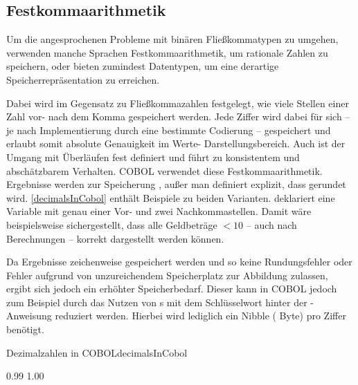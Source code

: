 \subsection*{Festkommaarithmetik}
Um die angesprochenen Probleme mit binären Fließkommatypen zu umgehen, verwenden manche Sprachen Festkommaarithmetik, um rationale Zahlen zu speichern, oder bieten zumindest Datentypen, um eine derartige Speicherrepräsentation zu erreichen. 

Dabei wird im Gegensatz zu Fließkommazahlen festgelegt, wie viele Stellen einer Zahl vor- \bzw nach dem Komma gespeichert werden. Jede Ziffer wird dabei für sich -- je nach Implementierung durch eine bestimmte Codierung -- gespeichert und erlaubt somit absolute Genauigkeit im Werte- \bzw Darstellungsbereich. Auch ist der Umgang mit Überläufen fest definiert und führt zu konsistentem und abschätzbarem Verhalten. COBOL verwendet diese Festkommaarithmetik. Ergebnisse werden zur Speicherung , außer man definiert explizit, dass gerundet wird. \autoref{decimalsInCobol} enthält Beispiele zu beiden Varianten.  deklariert eine Variable mit genau einer Vor- und zwei Nachkommastellen. Damit wäre beispielsweise sichergestellt, dass alle Geldbeträge $<10$ -- auch nach Berechnungen -- korrekt dargestellt werden können.

Da Ergebnisse zeichenweise gespeichert werden und so keine Rundungsfehler oder Fehler aufgrund von unzureichendem Speicherplatz zur Abbildung zulassen, ergibt sich jedoch ein erhöhter Speicherbedarf. Dieser kann in COBOL jedoch zum Beispiel durch das Nutzen von s mit dem Schlüsselwort  hinter der -Anweisung reduziert werden. Hierbei wird lediglich ein Nibble ( Byte) pro Ziffer benötigt.

\begin{codeWithCaption}{Dezimalzahlen in COBOL}{decimalsInCobol}
    \begin{shellwindow}
    0.99
    1.00
    \end{shellwindow}
\end{codeWithCaption}

